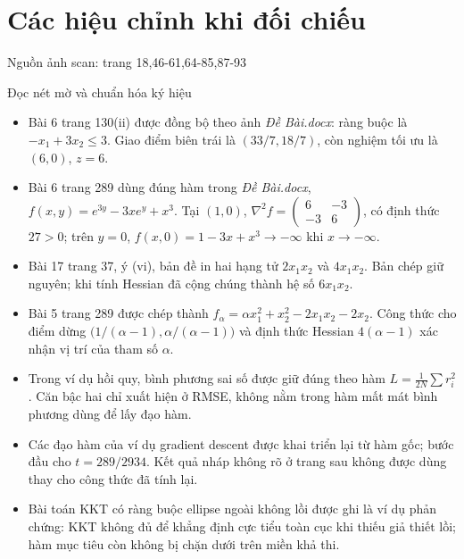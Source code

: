 \documentclass[11pt,a4paper]{article}
\newcommand{\Hess}{\nabla^2}
\newcommand{\src}[1]{\hfill{\footnotesize\color{gray}Nguồn ảnh scan: trang #1}}
\begin{document}
\section{Các hiệu chỉnh khi đối chiếu}
\src{18,46-61,64-85,87-93}
\begin{correction}{Đọc nét mờ và chuẩn hóa ký hiệu}
\begin{itemize}
\item Bài 6 trang 130(ii) được đồng bộ theo ảnh \textit{Đề Bài.docx}: ràng buộc là \(-x_1+3x_2\le3\). Giao điểm biên trái là \((33/7,18/7)\), còn nghiệm tối ưu là \((6,0)\), \(z=6\).
\item Bài 6 trang 289 dùng đúng hàm trong \textit{Đề Bài.docx}, \(f(x,y)=e^{3y}-3xe^y+x^3\). Tại \((1,0)\), \(\Hess f=\begin{pmatrix}6&-3\\-3&6\end{pmatrix}\), có định thức \(27>0\); trên \(y=0\), \(f(x,0)=1-3x+x^3\to-\infty\) khi \(x\to-\infty\).
\item Bài 17 trang 37, ý (vi), bản đề in hai hạng tử \(2x_1x_2\) và \(4x_1x_2\). Bản chép giữ nguyên; khi tính Hessian đã cộng chúng thành hệ số \(6x_1x_2\).
\item Bài 5 trang 289 được chép thành \(f_\alpha=\alpha x_1^2+x_2^2-2x_1x_2-2x_2\). Công thức cho điểm dừng \(\bigl(1/(\alpha-1),\alpha/(\alpha-1)\bigr)\) và định thức Hessian \(4(\alpha-1)\) xác nhận vị trí của tham số \(\alpha\).
\item Trong ví dụ hồi quy, bình phương sai số được giữ đúng theo hàm \(L=\frac1{2N}\sum r_i^2\). Căn bậc hai chỉ xuất hiện ở RMSE, không nằm trong hàm mất mát bình phương dùng để lấy đạo hàm.
\item Các đạo hàm của ví dụ gradient descent được khai triển lại từ hàm gốc; bước đầu cho \(t=289/2934\). Kết quả nháp không rõ ở trang sau không được dùng thay cho công thức đã tính lại.
\item Bài toán KKT có ràng buộc ellipse ngoài không lồi được ghi là ví dụ phản chứng: KKT không đủ để khẳng định cực tiểu toàn cục khi thiếu giả thiết lồi; hàm mục tiêu còn không bị chặn dưới trên miền khả thi.
\end{itemize}
\end{correction}
\end{document}
